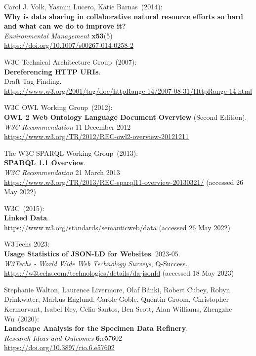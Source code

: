 \begin{thebibliography}{9}
Carol J. Volk, Yasmin Lucero, Katie Barnas~(2014): \\
\textbf{Why is data sharing in collaborative natural resource efforts so hard and what can we do to improve it?}\\
\emph{Environmental Management} \textbf{x53}(5) \\
\url{https://doi.org/10.1007/s00267-014-0258-2}

W3C Technical Architecture Group~(2007): \\
\textbf{Dereferencing HTTP URIs}.\\
Draft Tag Finding.\\
\url{https://www.w3.org/2001/tag/doc/httpRange-14/2007-08-31/HttpRange-14.html}

W3C OWL Working Group~(2012): \\
\textbf{{OWL} 2 {Web Ontology Language Document Overview}} ({Second Edition}). \\
\emph{W3C Recommendation} 11 December 2012 \\
\url{https://www.w3.org/TR/2012/REC-owl2-overview-20121211} 

The W3C SPARQL Working Group~(2013): \\
\textbf{{SPARQL} 1.1 {Overview}}. \\
\emph{W3C Recommendation} 21 March 2013 \\
\url{https://www.w3.org/TR/2013/REC-sparql11-overview-20130321/} (accessed 26 May 2022)

W3C~(2015): \\
\textbf{Linked Data}.\\
\url{https://www.w3.org/standards/semanticweb/data} (accessed 26 May 2022)

W3Techs 2023: \\
\textbf{Usage Statistics of JSON-LD for Websites}. 2023-05. \\
\emph{W3Techs - World Wide Web Technology Surveys}, Q-Success.\\
\url{https://w3techs.com/technologies/details/da-jsonld} (accessed 18
May 2023)

Stephanie Walton, Laurence Livermore, Olaf Bánki, Robert Cubey, Robyn Drinkwater, Markus Englund, Carole Goble, Quentin Groom, Christopher Kermorvant, Isabel Rey, Celia Santos, Ben Scott, Alan Williams, Zhengzhe Wu~(2020): \\
\textbf{Landscape Analysis for the Specimen Data Refinery}.\\
\emph{Research Ideas and Outcomes} \textbf{6}:e57602\\
\url{https://doi.org/10.3897/rio.6.e57602}


\end{thebibliography}
